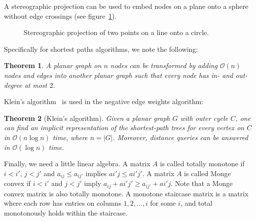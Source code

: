 \documentclass[11pt]{article}
\newtheorem{theorem}{Theorem}[section]
\begin{document}
A stereographic projection can be used to embed nodes on a plane onto a sphere without edge crossings (see figure~\ref{fig:stereo}).

\begin{figure}[!htb]
  \centering
  \caption{Stereographic projection of two points on a line onto a circle.}
  \label{fig:stereo}
\end{figure}

Specifically for shortest paths algorithms, we note the following:\\

\begin{theorem}
  A planar graph on $n$ nodes can be transformed by adding $\mathcal{O}(n)$ nodes and edges into another planar graph such that every node has in- and out-degree at most $2$.
\end{theorem}

Klein's algorithm~\cite{klein2005multiple} is used in the negative edge weights algorithm:\\

\begin{theorem}[Klein's algorithm]
Given a planar graph $G$ with outer cycle $C$, one can find an implicit representation of the shortest-path trees for every vertex on $C$ in $\mathcal{O}(n\log n)$ time, where $n=|G|$. Moreover, distance queries can be answered in $\mathcal{O}(\log n)$ time.
\end{theorem}

Finally, we need a little linear algebra. A matrix $A$ is called totally monotone if $i<i'$, $j<j'$ and $a_{ij}\leq a_{ij'}$ implies $a{i'j}\leq a{i'j'}$. A matrix $A$ is called Monge convex if $i<i'$ and $j<j'$ imply $a_{ij}+a{i'j'}\geq a_{ij'}+a{i'j}$. Note that a Monge convex matrix is also totally monotone. A monotone staircase matrix is a matrix where each row has entries on columns $1,2,\ldots, i$ for some $i$, and total monotonously holds within the staircase.
\end{document}
